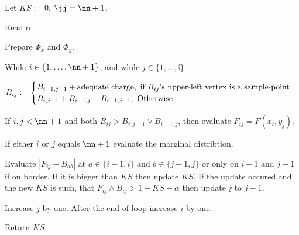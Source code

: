 



\begin{minipage}[h]{\linewidth}
\begin{algorithm}
	\item Let $KS := 0$, $\jj = \nn+1$. 
	\item Read $\alpha$
	\item Prepare $\Phi_x$ and $\Phi_y$.
	\item While $i \in \{1, \dots, \nn+1\}$, and while $j \in \{ 1, \dots, \ii \}$ 
	\begin{algorithm}
		\item $B_{ij} := 
			\begin{cases} 
				B_{i-1,j-1} + \text{adequate charge}, \text{ if $R_{ij}$'s upper-left vertex is a sample-point} \cr
				B_{i,j-1} + B_{i-1,j} -  B_{i-1,j-1}, \text{ Otherwise} 
			\end{cases}$	

		\item\label{whenToEvaluate} If $i,j < \nn+1$ and both $B_{ij} > B_{i,j-1} \vee B_{i-1,j}$, then evaluate $F_{ij} = F(x_i, y_j)$.

		\item If either $i$ or $j$ equals $\nn+1$ evaluate the marginal distribtion.

		\item\label{changes} Evaluate $|F_{ij} - B_{ab}|$ at $a \in \{i-1,i\}$ and $b \in \{j-1,j\}$ or only on $i-1$ and $j-1$ if on border. If it is bigger than $KS$ then update $KS$. If the update occured and the new $KS$ is such, that $F_{ij}\wedge B_{ij} > 1 - KS - \alpha$ then update $\jj$ to $j-1$.

		\item Increase $j$ by one. After the end of loop increase $i$ by one.

	\end{algorithm}
	\item Return $KS$.
\end{algorithm}
\end{minipage}
